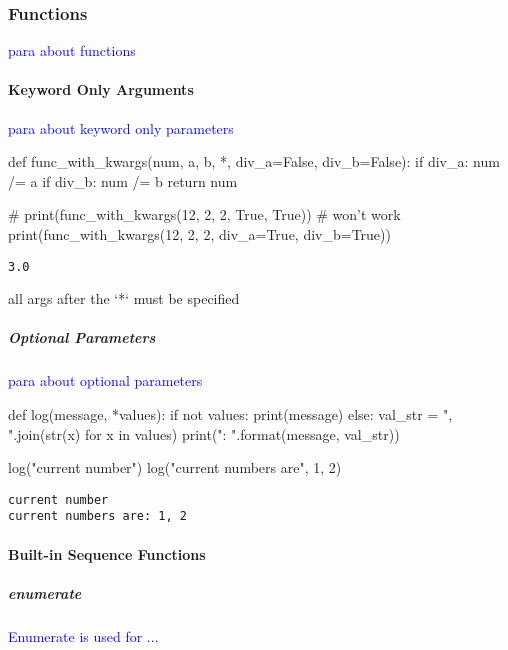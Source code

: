 \subsubsection{Functions}

\textcolor{blue}{para about functions}

\paragraph{Keyword Only Arguments}

\textcolor{blue}{para about keyword only parameters}

\begin{python}
def func_with_kwargs(num, a, b,
                    *,
                    div_a=False,
                    div_b=False):
    if div_a:
        num /= a
    if div_b:
        num /= b
    return num

# print(func_with_kwargs(12, 2, 2, True, True)) # won't work
print(func_with_kwargs(12, 2, 2, div_a=True, div_b=True))
\end{python}
\begin{lstlisting}[style=pyOutStyle]
3.0
\end{lstlisting}
\begin{markdown}
all args after the `*` must be specified
\end{markdown}


\subparagraph{Optional Parameters}

\textcolor{blue}{para about optional parameters}

\begin{python}
def log(message, *values):
    if not values:
        print(message)
    else:
        val_str = ", ".join(str(x) for x in values)
        print("{}: {}".format(message, val_str))

log("current number")
log("current numbers are", 1, 2)
\end{python}
\begin{lstlisting}[style=pyOutStyle]
current number
current numbers are: 1, 2
\end{lstlisting}

\paragraph{Built-in Sequence Functions}

\subparagraph{enumerate}

\textcolor{blue}{Enumerate is used for ...}

